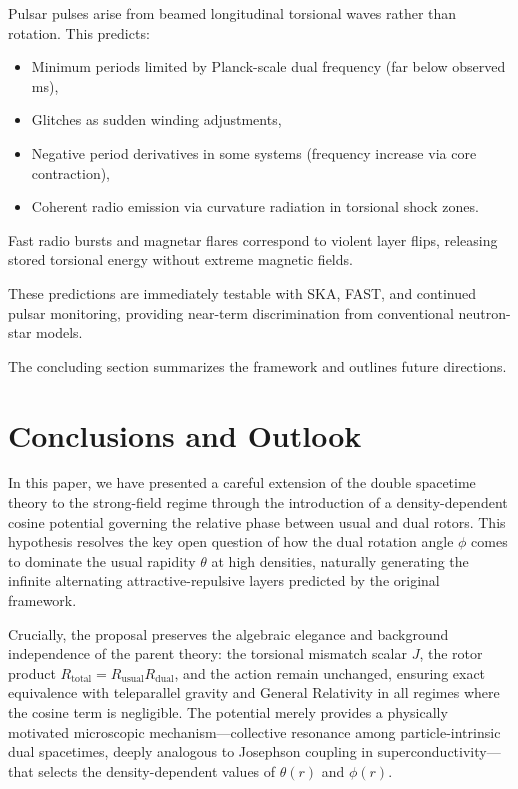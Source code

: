 \documentclass[a4paper]{article}
\begin{document}
Pulsar pulses arise from beamed longitudinal torsional waves rather than rotation. This predicts:
\begin{itemize}
  \item Minimum periods limited by Planck-scale dual frequency (far below observed ms),
  \item Glitches as sudden winding adjustments,
  \item Negative period derivatives in some systems (frequency increase via core contraction),
  \item Coherent radio emission via curvature radiation in torsional shock zones.
\end{itemize}

Fast radio bursts and magnetar flares correspond to violent layer flips, releasing stored torsional energy without extreme magnetic fields.

These predictions are immediately testable with SKA, FAST, and continued pulsar monitoring, providing near-term discrimination from conventional neutron-star models.

The concluding section summarizes the framework and outlines future directions.

\section{Conclusions and Outlook}
\label{sec:conclusions}

In this paper, we have presented a careful extension of the double spacetime theory to the strong-field regime through the introduction of a density-dependent cosine potential governing the relative phase between usual and dual rotors. This hypothesis resolves the key open question of how the dual rotation angle $\phi$ comes to dominate the usual rapidity $\theta$ at high densities, naturally generating the infinite alternating attractive-repulsive layers predicted by the original framework.

Crucially, the proposal preserves the algebraic elegance and background independence of the parent theory: the torsional mismatch scalar $J$, the rotor product $R_\text{total} = R_\text{usual} R_\text{dual}$, and the action remain unchanged, ensuring exact equivalence with teleparallel gravity and General Relativity in all regimes where the cosine term is negligible. The potential merely provides a physically motivated microscopic mechanism—collective resonance among particle-intrinsic dual spacetimes, deeply analogous to Josephson coupling in superconductivity—that selects the density-dependent values of $\theta(r)$ and $\phi(r)$.
\end{document}

